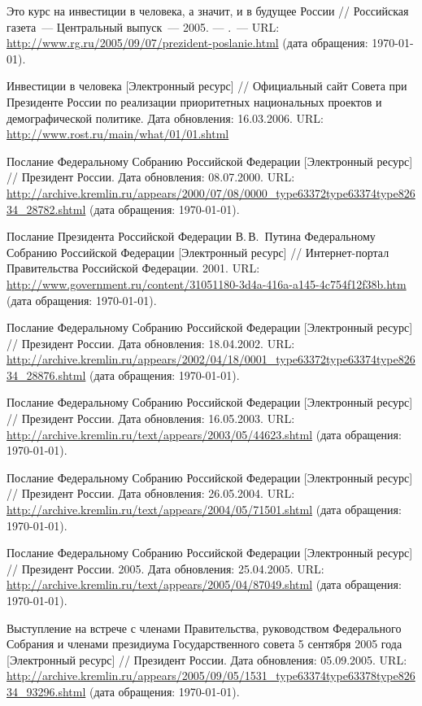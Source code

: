 \begin{thebibliography}{30}
 Это курс на инвестиции в человека, а значит, и в
  будущее России // Российская газета~--- Центральный выпуск~---
  2005. — .~--- URL:
  \url{http://www.rg.ru/2005/09/07/prezident-poslanie.html} (дата
  обращения: \today).

 Инвестиции в человека [Электронный ресурс] //
  Официальный сайт Совета при Президенте России по реализации
  приоритетных национальных проектов и демографической политике. Дата
  обновления: 16.03.2006. URL:
  \url{http://www.rost.ru/main/what/01/01.shtml}

 Послание Федеральному Собранию Российской
  Федерации [Электронный ресурс] // Президент России. Дата обновления:
  08.07.2000.  URL:
  \url{http://archive.kremlin.ru/appears/2000/07/08/0000_type63372type63374type82634_28782.shtml}
  (дата обращения: \today).

Послание Президента Российской Федерации
  В.\,В.~Путина Федеральному Собранию Российской Федерации
  [Электронный ресурс] // Интернет-портал Правительства Российской
  Федерации. 2001.  URL:
  \url{http://www.government.ru/content/31051180-3d4a-416a-a145-4c754f12f38b.htm}
  (дата обращения: \today).

 Послание Федеральному Собранию Российской
  Федерации [Электронный ресурс] // Президент России. Дата обновления:
  18.04.2002. URL:
  \url{http://archive.kremlin.ru/appears/2002/04/18/0001_type63372type63374type82634_28876.shtml}
  (дата обращения: \today).

 Послание Федеральному Собранию Российской
  Федерации [Электронный ресурс] // Президент России. Дата обновления:
  16.05.2003. URL:
  \url{http://archive.kremlin.ru/text/appears/2003/05/44623.shtml}
  (дата обращения: \today).

 Послание Федеральному Собранию Российской
  Федерации [Электронный ресурс] // Президент России. Дата обновления:
  26.05.2004. URL:
  \url{http://archive.kremlin.ru/text/appears/2004/05/71501.shtml}
  (дата обращения: \today).

 Послание Федеральному Собранию Российской
  Федерации [Электронный ресурс] // Президент России. 2005. Дата
  обновления: 25.04.2005. URL:
  \url{http://archive.kremlin.ru/text/appears/2005/04/87049.shtml}
  (дата обращения: \today).

 Выступление на встрече с членами Правительства,
  руководством Федерального Собрания и членами президиума
  Государственного совета 5 сентября 2005 года [Электронный ресурс] //
  Президент России. Дата обновления: 05.09.2005. URL:
  \url{http://archive.kremlin.ru/appears/2005/09/05/1531_type63374type63378type82634_93296.shtml}
  (дата обращения: \today).
  
\end{thebibliography}
